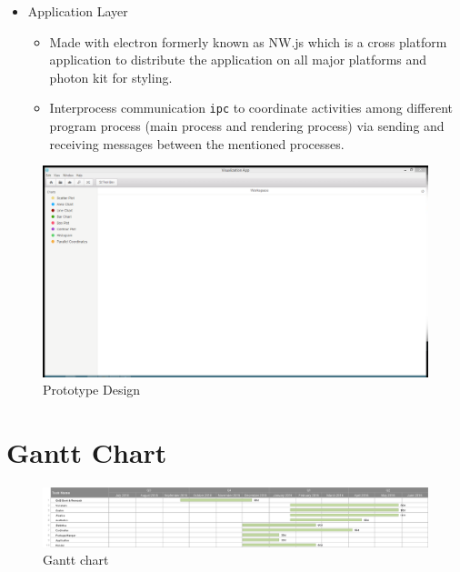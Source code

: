 \documentclass[12pt]{article}
\begin{document}
\begin{itemize}
\begin{itemize}
\begin{itemize}
\item Usage
\begin{itemize}
\item Add Or Update a plugin.
\begin{equation*}
vispack \hspace{3} install \hspace{3} plugin\_name \nonumber
\end{equation*}
\item Remove a plugin
\begin{equation*}
vispack \hspace{3} remove \hspace{3} plugin\_name \nonumber
\end{equation*}
\end{itemize}

\end{itemize}
\item {\Large Application Layer}
\begin{itemize}
\item Made with electron formerly known as NW.js which is a cross platform application to distribute the application on all major platforms and photon kit for styling.
\item Interprocess communication \texttt{ipc} to coordinate activities among different program process (main process and rendering process) via sending and  receiving messages between the mentioned processes.
\end{itemize}
\end{itemize}
\begin{figure}[h!]
\caption{Prototype Design}
\includegraphics[width=\textwidth]{prototype}

\end{figure}

\section{Gantt Chart}
\begin{figure}[h!]
\caption{Gantt chart}
\includegraphics[width=\textwidth]{gantt}


\end{figure}
\end{itemize}
\end{document}
